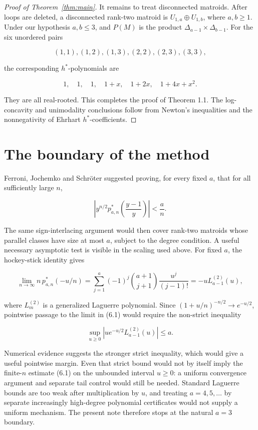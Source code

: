 \documentclass[11pt]{article}
\begin{document}
\begin{proof}[Proof of Theorem~\ref{thm:main}]
It remains to treat disconnected matroids. After loops are deleted, a
disconnected rank-two matroid is $U_{1,a}\oplus U_{1,b}$, where $a,b\ge1$.
Under our hypothesis $a,b\le3$, and $P(M)$ is the product
$\Delta_{a-1}\times\Delta_{b-1}$. For the six unordered pairs

\[
(1,1),(1,2),(1,3),(2,2),(2,3),(3,3),
\]

the corresponding $h^*$-polynomials are

\[
1,\quad1,\quad1,\quad1+x,\quad1+2x,\quad1+4x+x^2.
\]

They are all real-rooted. This completes the proof of Theorem 1.1. The
log-concavity and unimodality conclusions follow from Newton's inequalities
and the nonnegativity of Ehrhart $h^*$-coefficients.
\end{proof}


\section{The boundary of the method}


Ferroni, Jochemko and Schröter \cite[Section~6.1]{fjs} suggested proving, for every
fixed $a$, that for all sufficiently large $n$,

\[
\left|y^{n/2}p^*_{a,n}\!\left(\frac{y-1}{y}\right)\right|<\frac an.
                                                                        \tag{6.1}
\]

The same sign-interlacing argument would then cover rank-two matroids whose
parallel classes have size at most $a$, subject to the degree condition.
A useful necessary asymptotic test is visible in the scaling used above. For
fixed $a$, the hockey-stick identity gives

\[
\lim_{n\to\infty} n\,p^*_{a,n}(-u/n)
=\sum_{j=1}^a(-1)^j\binom{a+1}{j+1}\frac{u^j}{(j-1)!}
=-uL_{a-1}^{(2)}(u),                                                 \tag{6.2}
\]

where $L_m^{(2)}$ is a generalized Laguerre polynomial. Since
$(1+u/n)^{-n/2}\to e^{-u/2}$, pointwise passage to the limit in (6.1)
would require the non-strict inequality

\[
\sup_{u\ge0}|u e^{-u/2}L_{a-1}^{(2)}(u)|\le a.                       \tag{6.3}
\]

Numerical evidence suggests the stronger strict inequality, which would give
a useful pointwise margin. Even that strict bound would not by itself imply
the finite-$n$ estimate (6.1) on the unbounded interval $u\ge0$: a uniform
convergence argument and separate tail control would still be needed.
Standard Laguerre bounds are too weak after multiplication by $u$, and
treating $a=4,5,\ldots$ by separate increasingly high-degree polynomial
certificates would not supply a uniform mechanism. The present note therefore
stops at the natural $a=3$ boundary.
\end{document}
